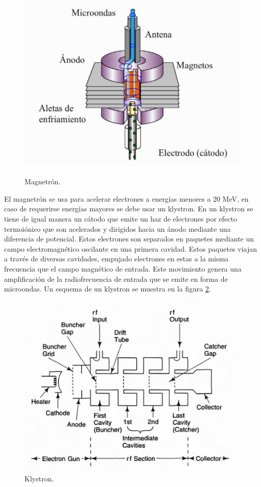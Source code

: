 \begin{figure}[H]
	\centering
	\includegraphics[width=0.7\linewidth]{images/magnetron2.png}
	\caption{Magnetrón\cite{magne2}.}
	\label{fig:magnetron}
\end{figure}

El magnetrón se usa para acelerar electrones a energías menores a 20 MeV, en caso de requerirse energías mayores se debe usar un klystron\cite{karzmark1993medical}. En un klystron se tiene de igual manera un cátodo que emite un haz de electrones por efecto termoiónico que son acelerados y dirigidos hacia un ánodo mediante una diferencia de potencial. Estos electrones son separados en paquetes mediante un campo electromagnético oscilante en una primera cavidad. Estos paquetes viajan a través de diversas cavidades, empujado electrones en estas a la misma frecuencia que el campo magnético de entrada. Este movimiento genera una amplificación de la radiofrecuencia de entrada que se emite en forma de microondas\cite{karzmark1993medical}. Un esquema de un klystron se muestra en la figura \ref{fig:klystron}.\\

\begin{figure}[H]
	\centering
	\includegraphics[width=0.7\linewidth]{images/klystron.png}
	\caption{Klystron\cite{karzmark1993medical}.}
	\label{fig:klystron}
\end{figure}

